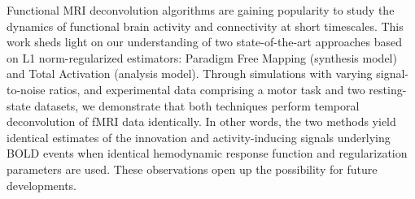 Functional MRI deconvolution algorithms are gaining popularity to study the dynamics of functional brain activity and connectivity at short timescales. This work sheds light on our understanding of two state-of-the-art approaches based on L1 norm-regularized estimators: Paradigm Free Mapping (synthesis model) and Total Activation (analysis model). Through simulations with varying signal-to-noise ratios, and experimental data comprising a motor task and two resting-state datasets, we demonstrate that both techniques perform temporal deconvolution of fMRI data identically. In other words, the two methods yield identical estimates of the innovation and activity-inducing signals underlying BOLD events when identical hemodynamic response function and regularization parameters are used. These observations open up the possibility for future developments.